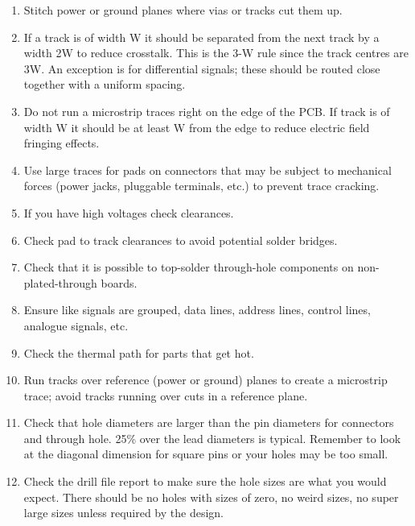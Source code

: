 \begin{enumerate}
\item Stitch power or ground planes where vias or tracks cut them up.

\item If a track is of width W it should be separated from the next
  track by a width 2W to reduce crosstalk.  This is the 3-W rule since
  the track centres are 3W.  An exception is for differential signals;
  these should be routed close together with a uniform spacing.

\item Do not run a microstrip traces right on the edge of the PCB.  If
  track is of width W it should be at least W from the edge to reduce
  electric field fringing effects.
  
\item Use large traces for pads on connectors that may be subject to
  mechanical forces (power jacks, pluggable terminals, etc.) to
  prevent trace cracking.
  
\item If you have high voltages check clearances.
  
\item Check pad to track clearances to avoid potential solder bridges.
  
\item Check that it is possible to top-solder through-hole components
  on non-plated-through boards.
  
\item Ensure like signals are grouped, data lines, address lines, control lines, analogue signals, etc.
  
\item Check the thermal path for parts that get hot.
  
\item Run tracks over reference (power or ground) planes to create a
  microstrip trace; avoid tracks running over cuts in a reference
  plane.
  
\item Check that hole diameters are larger than the pin diameters for
  connectors and through hole. 25\% over the lead diameters is
  typical.  Remember to look at the diagonal dimension for square pins
  or your holes may be too small.
  
\item Check the drill file report to make sure the hole sizes are what
  you would expect. There should be no holes with sizes of zero, no
  weird sizes, no super large sizes unless required by the design.
  

\end{enumerate}

